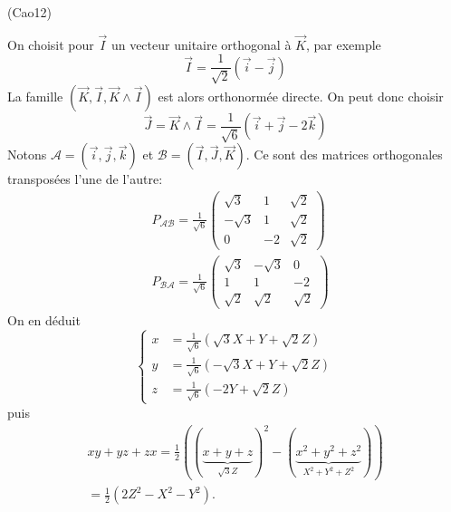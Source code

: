 \begin{tiny}(Cao12)\end{tiny} On choisit pour $\overrightarrow I$ un vecteur unitaire orthogonal à $\overrightarrow K$, par exemple
\begin{displaymath}
 \overrightarrow I = \frac{1}{\sqrt{2}}(\overrightarrow i -\overrightarrow j)
\end{displaymath}
La famille $(\overrightarrow K , \overrightarrow I, \overrightarrow K\wedge \overrightarrow I)$ est alors orthonormée directe. On peut donc choisir
\begin{displaymath}
 \overrightarrow J = \overrightarrow K\wedge \overrightarrow I
=
\frac{1}{\sqrt{6}}(\overrightarrow i + \overrightarrow j -2 \overrightarrow k)
\end{displaymath}
Notons $\mathcal A = (\overrightarrow i, \overrightarrow j, \overrightarrow k)$ et $\mathcal B = (\overrightarrow I, \overrightarrow J, \overrightarrow K)$. Ce sont des matrices orthogonales transposées l'une de l'autre:
\begin{align*}
 &P_{\mathcal A \mathcal B}=\frac{1}{\sqrt{6}}
\begin{pmatrix}
 \sqrt{3}&1&\sqrt{2}\\-\sqrt{3}&1&\sqrt{2}\\ 0&-2&\sqrt{2}
\end{pmatrix}\\
&P_{\mathcal B \mathcal A}=\frac{1}{\sqrt{6}}
\begin{pmatrix}
 \sqrt{3}&-\sqrt{3}&0\\1&1&-2\\ \sqrt{2}&\sqrt{2}&\sqrt{2}
\end{pmatrix}
\end{align*}
On en déduit
\begin{displaymath}
 \left\lbrace 
\begin{aligned}
x &=\frac{1}{\sqrt{6}}(\sqrt{3}X+Y+\sqrt{2}Z)\\
y &=\frac{1}{\sqrt{6}}(-\sqrt{3}X+Y+\sqrt{2}Z)\\
z &=\frac{1}{\sqrt{6}}(-2Y+\sqrt{2}Z)
\end{aligned}
\right. 
\end{displaymath}
puis
\begin{multline*}
xy + yz + zx = \frac{1}{2}\left( (\underset{\sqrt{3}Z}{\underbrace{x+y+z}})^2-(\underset{X^2+Y^2+Z^2}{\underbrace{x^2+y^2+z^2}})\right) \\
=  \frac{1}{2}\left( 2Z^2-X^2-Y^2\right) .
\end{multline*}
